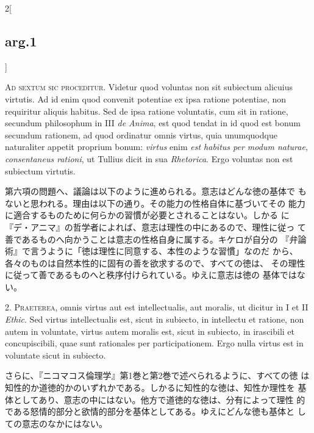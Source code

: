 \documentclass[paper=a4paper,fontsize=10pt,jafontsize=9pt,titlepage]{jlreq}
\begin{document}
\begin{paracol}{2}[\subsection{arg.1}]

{\scshape Ad sextum sic proceditur}. Videtur quod voluntas non sit
subiectum alicuius virtutis. Ad id enim quod convenit potentiae ex
ipsa ratione potentiae, non requiritur aliquis habitus. Sed de ipsa
ratione voluntatis, cum sit in ratione, secundum philosophum in III
{\itshape de Anima}, est quod tendat in id quod est bonum secundum
rationem, ad quod ordinatur omnis virtus, quia unumquodque naturaliter
appetit proprium bonum: {\itshape virtus} enim {\itshape est habitus
per modum naturae, consentaneus rationi}, ut Tullius dicit in sua
{\itshape Rhetorica}. Ergo voluntas non est subiectum virtutis.

\switchcolumn

第六項の問題へ、議論は以下のように進められる。意志はどんな徳の基体で
 もないと思われる。理由は以下の通り。その能力の性格自体に基づいてその
 能力に適合するものために何らかの習慣が必要とされることはない。しかる
 に『デ・アニマ』の哲学者によれば、意志は理性の中にあるので、理性に従っ
 て善であるものへ向かうことは意志の性格自身に属する。キケロが自分の
 『弁論術』で言うように「徳は理性に同意する、本性のような習慣」なのだ
 から、各々のものは自然本性的に固有の善を欲求するので、すべての徳は、
 その理性に従って善であるものへと秩序付けられている。ゆえに意志は徳の
 基体ではない。


2. {\scshape Praeterea}, omnis virtus aut est intellectualis, aut
moralis, ut dicitur in I et II {\itshape Ethic}. Sed virtus
intellectualis est, sicut in subiecto, in intellectu et ratione, non
autem in voluntate, virtus autem moralis est, sicut in subiecto, in
irascibili et concupiscibili, quae sunt rationales per
participationem. Ergo nulla virtus est in voluntate sicut in subiecto.

\switchcolumn

さらに、『ニコマコス倫理学』第1巻と第2巻で述べられるように、すべての徳
は知性的か道徳的かのいずれかである。しかるに知性的な徳は、知性か理性を
基体としてあり、意志の中にはない。他方で道徳的な徳は、分有によって理性
的である怒情的部分と欲情的部分を基体としてある。ゆえにどんな徳も基体と
しての意志のなかにはない。


\end{paracol}
\end{document}
